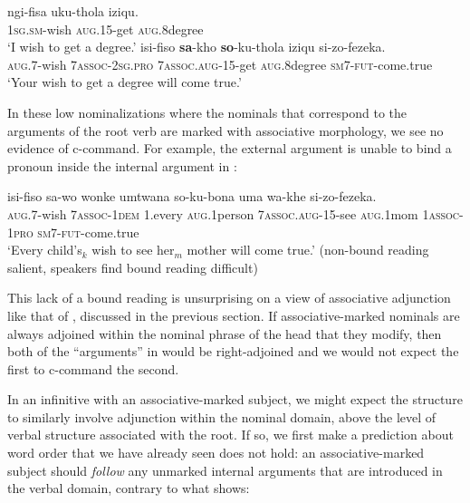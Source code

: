 \documentclass[output=paper,colorlinks,citecolor=brown]{langscibook}
\begin{document}
\ea%
    \label{ex:halpert:14}
    \ea%
    \label{ex:halpert:14a}
    \gll    ngi-fisa uku-thola iziqu.\\
            1\textsc{sg}.\textsc{sm}-wish \textsc{aug}.15-get \textsc{aug}.8degree\\
    \glt    `I wish to get a degree.' 
    \ex%
    \label{ex:halpert:14b}
    \gll    isi-fiso \textbf{sa}-kho \textbf{so}-ku-thola iziqu si-zo-fezeka.\\
            \textsc{aug}.7-wish 7\textsc{assoc}-2\textsc{sg}.\textsc{pro} 7\textsc{assoc}.\textsc{aug}-15-get \textsc{aug}.8degree \textsc{sm}7-\textsc{fut}-come.true\\
    \glt    `Your wish to get a degree will come true.'
    \z 
\z 

In these low nominalizations where the nominals that correspond to the arguments of the root verb are marked with associative morphology, we see no evidence of c-command. For example, the external argument is unable to bind a pronoun inside the internal argument in :

\ea%
    \label{ex:halpert:15}
    \gll    isi-fiso sa-wo wonke umtwana so-ku-bona uma wa-khe si-zo-fezeka.\\
            \textsc{aug}.7-wish 7\textsc{assoc}-1\textsc{dem} 1.every \textsc{aug}.1person 7\textsc{assoc}.\textsc{aug}-15-see \textsc{aug}.1mom 1\textsc{assoc}-1\textsc{pro} \textsc{sm}7-\textsc{fut}-come.true\\
    \glt    `Every child's$_k$ wish to see her$_m$ mother will come true.' (non-bound reading salient, speakers find bound reading difficult)
\z 

This lack of a bound reading is unsurprising on a view of associative adjunction like that of \citet{Pietraszko2019}, discussed in the previous section. If associative-marked nominals are always adjoined within the nominal phrase of the head that they modify, then both of the ``arguments'' in  would be right-adjoined and we would not expect the first to c-command the second.  

In an infinitive with an associative-marked subject, we might expect the structure to similarly involve adjunction within the nominal domain, above the level of verbal structure associated with the root.  If so, we first make a prediction about word order that we have already seen does not hold: an associative-marked subject should \textit{follow} any unmarked internal arguments that are introduced in the verbal domain, contrary to what  shows:
\end{document}
